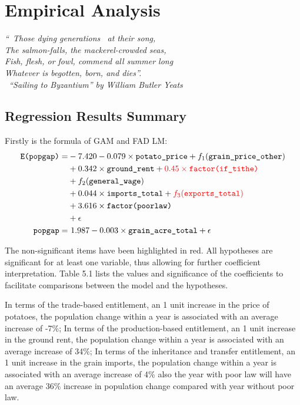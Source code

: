 \chapter{Empirical Analysis}

\textit{``\textendash\ Those dying generations \textendash\ at their song,\\
The salmon-falls, the mackerel-crowded seas,\\
Fish, flesh, or fowl, commend all summer long\\
Whatever is begotten, born, and dies''.\\
\textemdash\ ``Sailing to Byzantium'' by William Butler Yeats }

\vspace{.2cm}

\section{Regression Results Summary}

Firstly is the formula of GAM and FAD LM:
\vspace{-14pt}
\begin{align*}
\texttt{E(popgap)} = & - 7.420 - 0.079 \times \texttt{potato\_price} + f_1(\texttt{grain\_price\_other}) \\
                & + 0.342 \times \texttt{ground\_rent} + \textcolor{red}{0.45 \times \texttt{factor(if\_tithe)}} \\
                & + f_2(\texttt{general\_wage})  \\
                & + 0.044 \times \texttt{imports\_total} + \textcolor{red}{f_3(\texttt{exports\_total})}\\
                & + 3.616 \times \texttt{factor(poorlaw)} \\
                & + \epsilon \\
\texttt{popgap} = & \ 1.987 - 0.003 \times \texttt{grain\_acre\_total} + \epsilon
\end{align*}

The non-significant items have been highlighted in red. All hypotheses are significant for at least one variable, thus allowing for further coefficient interpretation. Table 5.1 lists the values and significance of the coefficients to facilitate comparisons between the model and the hypotheses.

In terms of the trade-based entitlement, an 1 unit increase in the price of potatoes, the population change within a year is associated with an average increase of -7\%; In terms of the production-based entitlement, an 1 unit increase in the ground rent, the population change within a year is associated with an average increase of 34\%; In terms of the inheritance and transfer entitlement, an 1 unit increase in the grain imports, the population change within a year is associated with an average increase of 4\% also the year with poor law will have an average 36\% increase in population change compared with year without poor law.

